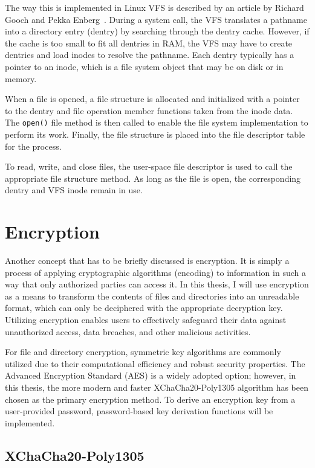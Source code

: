 The way this is implemented in Linux VFS is described by an article by Richard Gooch and Pekka Enberg~\cite{vfs}.
During a system call, the VFS translates a pathname into a directory entry (dentry) by searching through the dentry cache.
However, if the cache is too small to fit all dentries in RAM, the VFS may have to create dentries and load inodes to resolve the pathname.
Each dentry typically has a pointer to an inode, which is a file system object that may be on disk or in memory.

When a file is opened, a file structure is allocated and initialized with a pointer to the dentry and file operation member functions taken from the inode data.
The \texttt{open()} file method is then called to enable the file system implementation to perform its work.
Finally, the file structure is placed into the file descriptor table for the process.

To read, write, and close files, the user-space file descriptor is used to call the appropriate file structure method.
As long as the file is open, the corresponding dentry and VFS inode remain in use.


\section{Encryption}\label{sec:encryption-approaches}

Another concept that has to be briefly discussed is encryption.
It is simply a process of applying cryptographic algorithms (encoding) to information in such a way that only authorized parties can access it.
In this thesis, I will use encryption as a means to transform the contents of files and directories into an unreadable format, which can only be deciphered with the appropriate decryption key.
Utilizing encryption enables users to effectively safeguard their data against unauthorized access, data breaches, and other malicious activities.

For file and directory encryption, symmetric key algorithms are commonly utilized due to their computational efficiency and robust security properties.
The Advanced Encryption Standard (AES) is a widely adopted option; however, in this thesis, the more modern and faster XChaCha20-Poly1305 algorithm has been chosen as the primary encryption method.
To derive an encryption key from a user-provided password, password-based key derivation functions will be implemented.

\subsection{XChaCha20-Poly1305}\label{subsec:xchacha20-poly1305}

